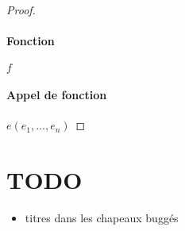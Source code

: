 \begin{proof}
\paragraph{ Fonction }              $ f $ %

\paragraph{ Appel de fonction }     $ e (e_1, …, e_n) $ %


\end{proof}

\section*{TODO}

\begin{itemize}
\item
  titres dans les chapeaux buggés
\end{itemize}
